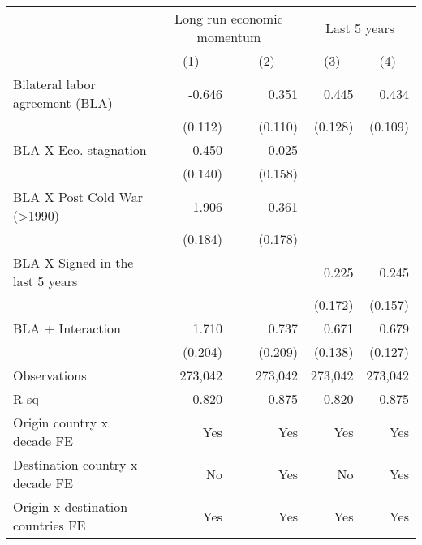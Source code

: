 \begin{tabular}{l*{4}{r}} \toprule
                    &\multicolumn{2}{c}{Long run economic momentum}&\multicolumn{2}{c}{Last 5 years}           \\\cmidrule(lr){2-3}\cmidrule(lr){4-5}
                    &\multicolumn{1}{c}{(1)}         &\multicolumn{1}{c}{(2)}         &\multicolumn{1}{c}{(3)}         &\multicolumn{1}{c}{(4)}         \\
\midrule
Bilateral labor agreement (BLA)&      -0.646\sym{***}&       0.351\sym{***}&       0.445\sym{***}&       0.434\sym{***}\\
                    &     (0.112)         &     (0.110)         &     (0.128)         &     (0.109)         \\
BLA X Eco. stagnation&       0.450\sym{***}&       0.025         &                     &                     \\
                    &     (0.140)         &     (0.158)         &                     &                     \\
BLA X Post Cold War (>1990)&       1.906\sym{***}&       0.361\sym{**} &                     &                     \\
                    &     (0.184)         &     (0.178)         &                     &                     \\
BLA X Signed in the last 5 years&                     &                     &       0.225         &       0.245         \\
                    &                     &                     &     (0.172)         &     (0.157)         \\
\addlinespace
BLA + Interaction   &       1.710\sym{***}&       0.737\sym{***}&       0.671\sym{***}&       0.679\sym{***}\\
                    &     (0.204)         &     (0.209)         &     (0.138)         &     (0.127)         \\\bottomrule
\addlinespace
\addlinespace
Observations        &     273,042         &     273,042         &     273,042         &     273,042         \\
R-sq                &       0.820         &       0.875         &       0.820         &       0.875         \\
Origin country x decade FE&         Yes         &         Yes         &         Yes         &         Yes         \\
Destination country x decade FE&          No         &         Yes         &          No         &         Yes         \\
Origin x destination countries FE&         Yes         &         Yes         &         Yes         &         Yes         \\
\bottomrule \end{tabular}
